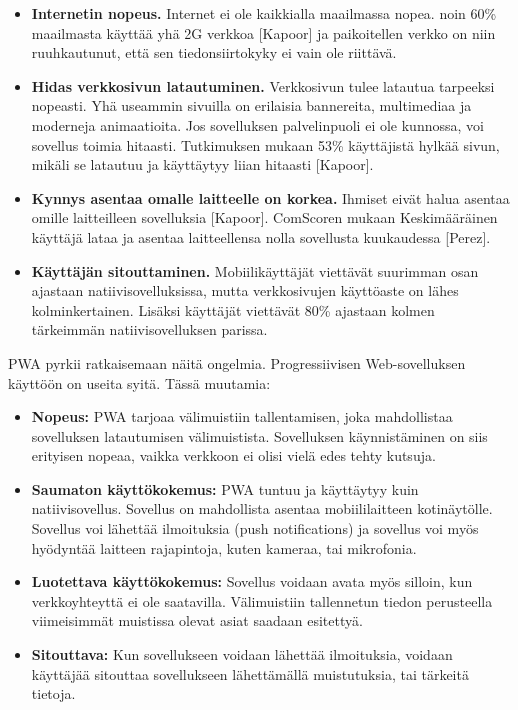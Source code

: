 \documentclass{tktltiki}
\begin{document}
\begin{itemize}
  \item \textbf{Internetin nopeus.} Internet ei ole kaikkialla maailmassa nopea. noin 60\% maailmasta käyttää yhä 2G verkkoa [Kapoor] ja paikoitellen verkko on niin ruuhkautunut, että sen tiedonsiirtokyky ei vain ole riittävä.
  \item \textbf{Hidas verkkosivun latautuminen.} Verkkosivun tulee latautua tarpeeksi nopeasti. Yhä useammin sivuilla on erilaisia bannereita, multimediaa ja moderneja animaatioita. Jos sovelluksen palvelinpuoli ei ole kunnossa, voi sovellus toimia hitaasti. Tutkimuksen mukaan 53\% käyttäjistä hylkää sivun, mikäli se latautuu ja käyttäytyy liian hitaasti [Kapoor].
  \item \textbf{Kynnys asentaa omalle laitteelle on korkea.} Ihmiset eivät halua asentaa omille laitteilleen sovelluksia [Kapoor]. ComScoren mukaan Keskimääräinen käyttäjä lataa ja asentaa laitteellensa nolla sovellusta kuukaudessa [Perez].
  \item \textbf{Käyttäjän sitouttaminen.} Mobiilikäyttäjät viettävät suurimman osan ajastaan natiivisovelluksissa, mutta verkkosivujen käyttöaste on lähes kolminkertainen. Lisäksi käyttäjät viettävät 80\% ajastaan kolmen tärkeimmän natiivisovelluksen parissa. 
\end{itemize}

PWA pyrkii ratkaisemaan näitä ongelmia. Progressiivisen Web-sovelluksen käyttöön on useita syitä. Tässä muutamia:

\begin{itemize}
  \item \textbf{Nopeus:} PWA tarjoaa välimuistiin tallentamisen, joka mahdollistaa sovelluksen latautumisen välimuistista. Sovelluksen käynnistäminen on siis erityisen nopeaa, vaikka verkkoon ei olisi vielä edes tehty kutsuja.
  \item \textbf{Saumaton käyttökokemus:} PWA tuntuu ja käyttäytyy kuin natiivisovellus. Sovellus on mahdollista asentaa mobiililaitteen kotinäytölle. Sovellus voi lähettää ilmoituksia (push notifications) ja sovellus voi myös hyödyntää laitteen rajapintoja, kuten kameraa, tai mikrofonia. 
  \item \textbf{Luotettava käyttökokemus:} Sovellus voidaan avata myös silloin, kun verkkoyhteyttä ei ole saatavilla. Välimuistiin tallennetun tiedon perusteella viimeisimmät muistissa olevat asiat saadaan esitettyä. 
  \item \textbf{Sitouttava:} Kun sovellukseen voidaan lähettää ilmoituksia, voidaan käyttäjää sitouttaa sovellukseen lähettämällä muistutuksia, tai tärkeitä tietoja. 
\end{itemize}
\end{document}
